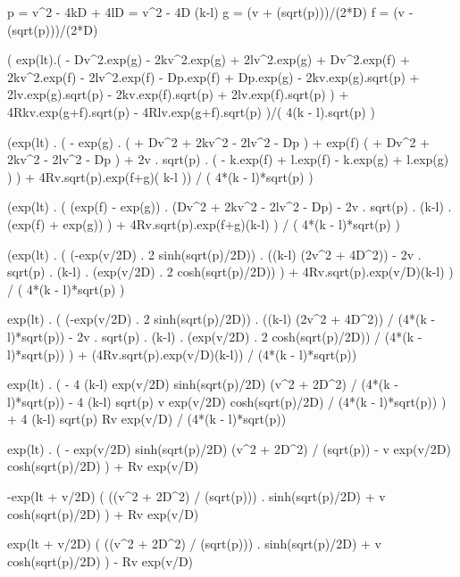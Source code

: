 p = v^2 - 4kD + 4lD = v^2 - 4D (k-l)
g = (v + (sqrt(p)))/(2*D)
f = (v - (sqrt(p)))/(2*D)

(
    exp(lt).(
        - Dv^2.exp(g)
        - 2kv^2.exp(g)
        + 2lv^2.exp(g)
        + Dv^2.exp(f)
        + 2kv^2.exp(f)
        - 2lv^2.exp(f)
        - Dp.exp(f)
        + Dp.exp(g)
        - 2kv.exp(g).sqrt(p)
        + 2lv.exp(g).sqrt(p)
        - 2kv.exp(f).sqrt(p)
        + 2lv.exp(f).sqrt(p)
    )
    + 4Rkv.exp(g+f).sqrt(p)
    - 4Rlv.exp(g+f).sqrt(p)
)/(
    4(k - l).sqrt(p)
)



(exp(lt) . (
    - exp(g) . (
        + Dv^2 
        + 2kv^2 
        - 2lv^2 
        - Dp 
    ) + exp(f) (
        + Dv^2 
        + 2kv^2 
        - 2lv^2 
        - Dp 
    ) + 2v . sqrt(p) . (
        - k.exp(f) 
        + l.exp(f) 
        - k.exp(g) 
        + l.exp(g)
    ) 
) + 4Rv.sqrt(p).exp(f+g)(
    k-l
)) / (
    4*(k - l)*sqrt(p)
)



(exp(lt) . (
    (exp(f) - exp(g)) . (Dv^2 + 2kv^2 - 2lv^2 - Dp)
    - 2v . sqrt(p) . (k-l) . (exp(f) + exp(g))
    ) 
+ 4Rv.sqrt(p).exp(f+g)(k-l)
) / (
    4*(k - l)*sqrt(p)
)


(exp(lt) . (
    (-exp(v/2D) . 2 sinh(sqrt(p)/2D)) . ((k-l) (2v^2 + 4D^2))
    - 2v . sqrt(p) . (k-l) . (exp(v/2D) . 2 cosh(sqrt(p)/2D))
    ) 
+ 4Rv.sqrt(p).exp(v/D)(k-l)
) / (
    4*(k - l)*sqrt(p)
)

exp(lt) . (
    (-exp(v/2D) . 2 sinh(sqrt(p)/2D)) . ((k-l) (2v^2 + 4D^2)) / (4*(k - l)*sqrt(p))
    - 2v . sqrt(p) . (k-l) . (exp(v/2D) . 2 cosh(sqrt(p)/2D)) / (4*(k - l)*sqrt(p))
    ) 
+ (4Rv.sqrt(p).exp(v/D)(k-l)) / (4*(k - l)*sqrt(p))

exp(lt) . (
    - 4 (k-l) exp(v/2D) sinh(sqrt(p)/2D) (v^2 + 2D^2) / (4*(k - l)*sqrt(p))
    - 4 (k-l) sqrt(p) v exp(v/2D) cosh(sqrt(p)/2D) / (4*(k - l)*sqrt(p))
    ) 
+ 4 (k-l) sqrt(p) Rv exp(v/D)  / (4*(k - l)*sqrt(p))

exp(lt) . (
    - exp(v/2D) sinh(sqrt(p)/2D) (v^2 + 2D^2) / (sqrt(p))
    - v exp(v/2D) cosh(sqrt(p)/2D)
    ) 
+ Rv exp(v/D)

-exp(lt + v/2D) (
    ((v^2 + 2D^2) / (sqrt(p))) . sinh(sqrt(p)/2D) 
    + v  cosh(sqrt(p)/2D)
    ) 
+ Rv exp(v/D)

exp(lt + v/2D) (
    ((v^2 + 2D^2) / (sqrt(p))) . sinh(sqrt(p)/2D) 
    + v  cosh(sqrt(p)/2D)
    ) 
- Rv exp(v/D)
